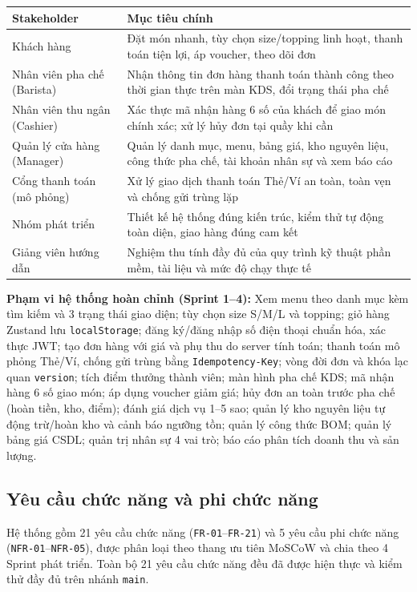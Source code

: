\documentclass[12pt, a4paper]{article}
\begin{document}
\begin{table}[!htbp]\centering\small
\begin{tabularx}{\textwidth}{@{}l X@{}}
\toprule \textbf{Stakeholder} & \textbf{Mục tiêu chính} \\ \midrule
Khách hàng & Đặt món nhanh, tùy chọn size/topping linh hoạt, thanh toán tiện lợi, áp voucher, theo dõi đơn \\
Nhân viên pha chế (Barista) & Nhận thông tin đơn hàng thanh toán thành công theo thời gian thực trên màn KDS, đổi trạng thái pha chế \\
Nhân viên thu ngân (Cashier) & Xác thực mã nhận hàng 6 số của khách để giao món chính xác; xử lý hủy đơn tại quầy khi cần \\
Quản lý cửa hàng (Manager) & Quản lý danh mục, menu, bảng giá, kho nguyên liệu, công thức pha chế, tài khoản nhân sự và xem báo cáo \\
Cổng thanh toán (mô phỏng) & Xử lý giao dịch thanh toán Thẻ/Ví an toàn, toàn vẹn và chống gửi trùng lặp \\
Nhóm phát triển & Thiết kế hệ thống đúng kiến trúc, kiểm thử tự động toàn diện, giao hàng đúng cam kết \\
Giảng viên hướng dẫn & Nghiệm thu tính đầy đủ của quy trình kỹ thuật phần mềm, tài liệu và mức độ chạy thực tế \\ \bottomrule
\end{tabularx}
\end{table}

\textbf{Phạm vi hệ thống hoàn chỉnh (Sprint 1--4):}
Xem menu theo danh mục kèm tìm kiếm và 3 trạng thái giao diện; tùy chọn size S/M/L và topping; giỏ hàng Zustand lưu \texttt{localStorage};
đăng ký/đăng nhập số điện thoại chuẩn hóa, xác thực JWT; tạo đơn hàng với giá và phụ thu do server tính toán;
thanh toán mô phỏng Thẻ/Ví, chống gửi trùng bằng \texttt{Idempotency-Key}; vòng đời đơn và khóa lạc quan \texttt{version};
tích điểm thưởng thành viên; màn hình pha chế KDS; mã nhận hàng 6 số giao món; áp dụng voucher giảm giá;
hủy đơn an toàn trước pha chế (hoàn tiền, kho, điểm); đánh giá dịch vụ 1--5 sao;
quản lý kho nguyên liệu tự động trừ/hoàn kho và cảnh báo ngưỡng tồn; quản lý công thức BOM; quản lý bảng giá CSDL;
quản trị nhân sự 4 vai trò; báo cáo phân tích doanh thu và sản lượng.

\subsection{Yêu cầu chức năng và phi chức năng}
Hệ thống gồm 21 yêu cầu chức năng (\texttt{FR-01}--\texttt{FR-21}) và 5 yêu cầu phi chức năng (\texttt{NFR-01}--\texttt{NFR-05}),
được phân loại theo thang ưu tiên MoSCoW và chia theo 4 Sprint phát triển. Toàn bộ 21 yêu cầu chức năng đều đã được hiện thực và kiểm thử đầy đủ trên nhánh \texttt{main}.
\end{document}
